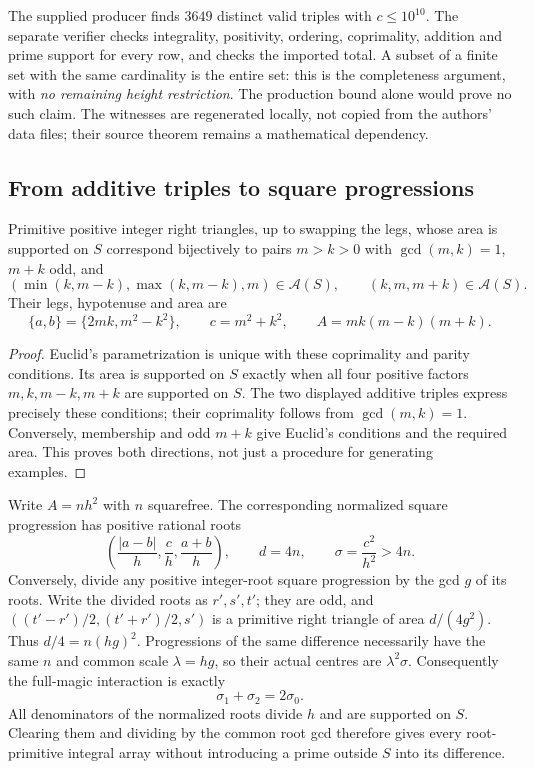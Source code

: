 The supplied producer finds $3649$ distinct valid triples with
$c\le10^{10}$. The separate verifier checks integrality, positivity,
ordering, coprimality, addition and prime support for every row, and checks
the imported total. A subset of a finite set with the same cardinality is
the entire set: this is the completeness argument, with \emph{no remaining
height restriction}. The production bound alone would prove no such claim.
The witnesses are regenerated locally, not copied from the authors' data
files; their source theorem remains a mathematical dependency.

\subsection{From additive triples to square progressions}

\begin{lemma}\label{lem:trianglecatalogue}
Primitive positive integer right triangles, up to swapping the legs, whose
area is supported on $S$ correspond bijectively to pairs $m>k>0$ with
$\gcd(m,k)=1$, $m+k$ odd, and
\[
(\min(k,m-k),\max(k,m-k),m)\in\mathcal A(S),\qquad
(k,m,m+k)\in\mathcal A(S).
\]
Their legs, hypotenuse and area are
\[
\{a,b\}=\{2mk,m^2-k^2\},\qquad c=m^2+k^2,
\qquad A=mk(m-k)(m+k).
\]
\end{lemma}
\begin{proof}
Euclid's parametrization is unique with these coprimality and parity
conditions. Its area is supported on $S$ exactly when all four positive
factors $m,k,m-k,m+k$ are supported on $S$. The two displayed additive
triples express precisely these conditions; their coprimality follows
from $\gcd(m,k)=1$. Conversely, membership and odd $m+k$ give Euclid's
conditions and the required area. This proves both directions, not just
a procedure for generating examples.
\end{proof}

Write $A=n h^2$ with $n$ squarefree. The corresponding normalized square
progression has positive rational roots
\[
\left(\frac{|a-b|}{h},\frac c h,\frac{a+b}{h}\right),
\qquad d=4n,\qquad \sigma=\frac{c^2}{h^2}>4n.
\]
Conversely, divide any positive integer-root square progression by the gcd
$g$ of its roots. Write the divided roots as $r',s',t'$; they are odd,
and $((t'-r')/2,(t'+r')/2,s')$ is a primitive right triangle of area
$d/(4g^2)$.
Thus $d/4=n(hg)^2$. Progressions of the same difference necessarily have
the same $n$ and common scale $\lambda=hg$, so their actual centres are
$\lambda^2\sigma$. Consequently the full-magic interaction is exactly
\[
\sigma_1+\sigma_2=2\sigma_0.
\]
All denominators of the normalized roots divide $h$ and are supported on
$S$. Clearing them and dividing by the common root gcd therefore gives
every root-primitive integral array without introducing a prime outside
$S$ into its difference.

